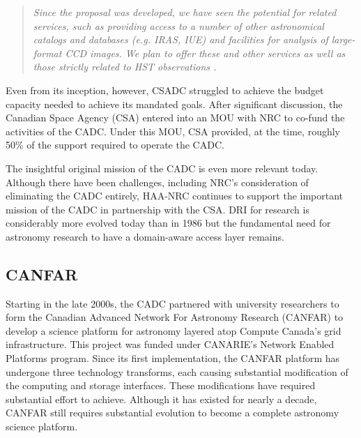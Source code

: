 \documentclass[11pt]{article}
\begin{document}
\begin{quote}
    {\it Since the proposal was developed, we have seen the potential for related services, such as providing access to a number of other astronomical catalogs and databases (e.g. IRAS, IUE) and facilities for analysis of large-format CCD images. We plan to offer these and other services as well as those strictly related to HST observations \citep{1987CassCSADC}.}
\end{quote}

Even from its inception, however, CSADC struggled to achieve the budget capacity needed to achieve its mandated goals.  After significant discussion, the Canadian Space Agency (CSA) entered into an MOU with NRC to co-fund the activities of the CADC. Under this MOU, CSA provided, at the time, roughly 50\% of the support required to operate the CADC.   


The insightful original mission of the CADC is even more relevant today.  Although there have been challenges, including NRC's consideration of eliminating the CADC entirely, HAA-NRC continues to support the important mission of the CADC in partnership with the CSA. 
DRI for research is considerably more evolved today than in 1986 but the fundamental need for astronomy research to have a domain-aware access layer remains. 

\subsection{CANFAR}
Starting in the late 2000s, the CADC partnered with university researchers to form the Canadian Advanced Network For Astronomy Research (CANFAR) to develop a science platform for astronomy layered atop Compute Canada's grid infrastructure.  
This project was funded under CANARIE's Network Enabled Platforms program.  
Since its first implementation, the CANFAR platform has undergone three technology transforms, each causing substantial modification of the computing and storage interfaces.  
These modifications have required substantial effort to achieve.  Although it has existed for nearly a decade, CANFAR still requires substantial evolution to become a complete astronomy science platform. 
\end{document}
